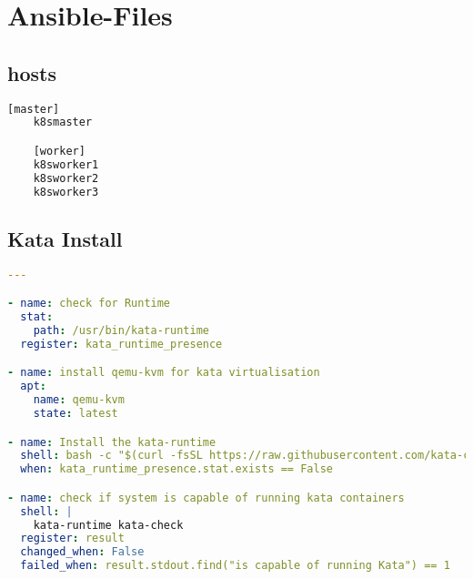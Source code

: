 \chapter{Ansible-Files}

\section{hosts}
\hfill \newline
\label{app:hosts_file}
\begin{lstlisting}[language=bash]
    [master]
    k8smaster

    [worker]
    k8sworker1
    k8sworker2
    k8sworker3    
\end{lstlisting}

\section{Kata Install}
\hfill \newline
\label{app:kata_install}
\begin{lstlisting}[language=yaml]
---

- name: check for Runtime
  stat:
    path: /usr/bin/kata-runtime
  register: kata_runtime_presence

- name: install qemu-kvm for kata virtualisation
  apt:
    name: qemu-kvm
    state: latest

- name: Install the kata-runtime 
  shell: bash -c "$(curl -fsSL https://raw.githubusercontent.com/kata-containers/tests/master/cmd/kata-manager/kata-manager.sh) install-packages"
  when: kata_runtime_presence.stat.exists == False

- name: check if system is capable of running kata containers
  shell: |
    kata-runtime kata-check
  register: result
  changed_when: False 
  failed_when: result.stdout.find("is capable of running Kata") == 1
\end{lstlisting}

